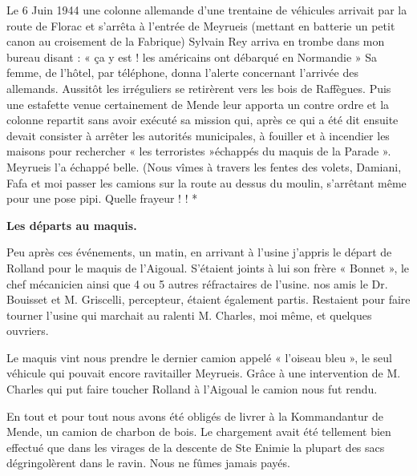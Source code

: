 \vspace{0.45cm}

Le 6 Juin 1944 une colonne allemande d’une trentaine de véhicules arrivait par la route de
Florac et s’arrêta à l’entrée de Meyrueis (mettant en batterie un petit canon au croisement de
la Fabrique) Sylvain Rey arriva en trombe dans mon bureau disant : « ça y est ! les
américains ont débarqué en Normandie » Sa femme, de l’hôtel, par téléphone, donna l’alerte
concernant l’arrivée des allemands. Aussitôt les irréguliers se retirèrent vers les bois de
Raffègues.
Puis une estafette venue certainement de Mende leur apporta un contre ordre et la colonne
repartit sans avoir exécuté sa mission qui, après ce qui a été dit ensuite devait consister à
arrêter les autorités municipales, à fouiller et à incendier les maisons pour rechercher « les
terroristes »échappés du maquis de la Parade ». Meyrueis l’a échappé belle. (Nous vîmes à
travers les fentes des volets, Damiani, Fafa et moi passer les camions sur la route au dessus
du moulin, s’arrêtant même pour une pose pipi. Quelle frayeur ! ! *

\vspace{0.55cm}

\textbf{Les départs au maquis.}

\vspace{0.35cm}

Peu après ces événements, un matin, en arrivant à l’usine j’appris le départ de Rolland pour le
maquis de l’Aigoual. S’étaient joints à lui son frère « Bonnet », le chef mécanicien ainsi que
4 ou 5 autres réfractaires de l’usine. nos amis le Dr. Bouisset et M. Griscelli, percepteur,
étaient également partis. Restaient pour faire tourner l’usine qui marchait au ralenti M.
Charles, moi même, et quelques ouvriers.

\vspace{0.45cm}

Le maquis vint nous prendre le dernier camion appelé « l’oiseau bleu », le seul véhicule qui
pouvait encore ravitailler Meyrueis. Grâce à une intervention de M. Charles qui put faire
toucher Rolland à l’Aigoual le camion nous fut rendu.

\vspace{0.45cm}

En tout et pour tout nous avons été obligés de livrer à la Kommandantur de Mende, un camion
de charbon de bois. Le chargement avait été tellement bien effectué que dans les virages de la descente de Ste Enimie la plupart des sacs dégringolèrent dans le ravin. Nous ne fûmes jamais
payés.

